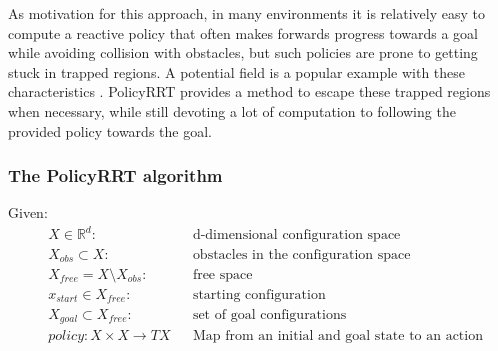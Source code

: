 \documentclass[../thesis.tex]{subfiles}
\begin{document}
As motivation for this approach, in many environments it is relatively easy to compute a reactive policy that often makes forwards progress towards a goal while avoiding collision with obstacles,
but such policies are prone to getting stuck in trapped regions.
A potential field is a popular example with these characteristics \cite{koren1991potential}.
PolicyRRT provides a method to escape these trapped regions when necessary, while still devoting a lot of computation to following the provided policy towards the goal.



\subsubsection{The PolicyRRT algorithm}

Given:
\begin{align}
    &X \in \mathbb{R}^d:     &&\text{d-dimensional configuration space}\\
    &X_{obs} \subset X:      &&\text{obstacles in the configuration space}\\
    &X_{free} = X \setminus X_{obs}:   &&\text{free space}\\
    &x_{start} \in X_{free}:  &&\text{starting configuration}\\
    &X_{goal} \subset X_{free}: &&\text{set of goal configurations}\\
    &policy: X \times X \rightarrow TX &&\text{Map from an initial and goal state to an action}
\end{align}
\end{document}
